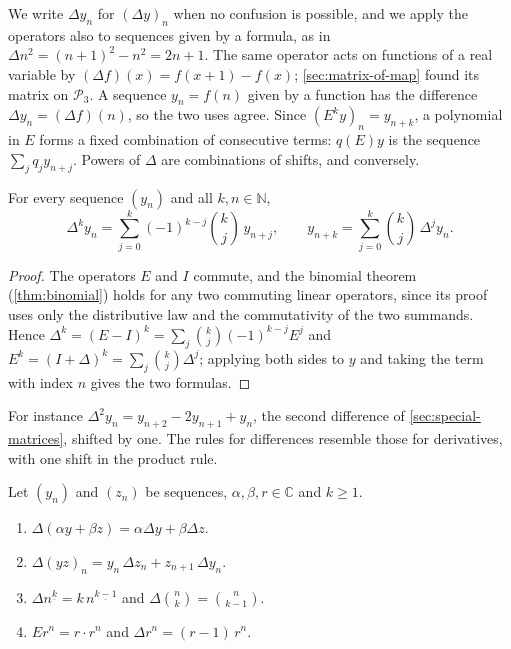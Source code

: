 We write $\Delta y_n$ for $(\Delta y)_n$ when no confusion is possible, and we apply the operators also to sequences given by a formula, as in $\Delta n^2=(n+1)^2-n^2=2n+1$. The same operator acts on functions of a real variable by $(\Delta f)(x)=f(x+1)-f(x)$; \cref{sec:matrix-of-map} found its matrix on $\mathcal P_3$. A sequence $y_n=f(n)$ given by a function has the difference $\Delta y_n=(\Delta f)(n)$, so the two uses agree. Since $(E^ky)_n=y_{n+k}$, a polynomial in $E$ forms a fixed combination of consecutive terms: $q(E)y$ is the sequence $\sum_jq_jy_{n+j}$. Powers of $\Delta$ are combinations of shifts, and conversely.

\begin{proposition}
\label{prop:difference-powers}
For every sequence $(y_n)$ and all $k,n\in\mathbb N$,
\[
\Delta^ky_n=\sum_{j=0}^k(-1)^{k-j}\binom kj\,y_{n+j},\qquad y_{n+k}=\sum_{j=0}^k\binom kj\,\Delta^jy_n .
\]
\end{proposition}

\begin{proof}
The operators $E$ and $I$ commute, and the binomial theorem (\cref{thm:binomial}) holds for any two commuting linear operators, since its proof uses only the distributive law and the commutativity of the two summands. Hence $\Delta^k=(E-I)^k=\sum_j\binom kj(-1)^{k-j}E^j$ and $E^k=(I+\Delta)^k=\sum_j\binom kj\Delta^j$; applying both sides to $y$ and taking the term with index $n$ gives the two formulas.
\end{proof}

For instance $\Delta^2y_n=y_{n+2}-2y_{n+1}+y_n$, the second difference of \cref{sec:special-matrices}, shifted by one. The rules for differences resemble those for derivatives, with one shift in the product rule.

\begin{proposition}
\label{prop:difference-rules}
Let $(y_n)$ and $(z_n)$ be sequences, $\alpha,\beta,r\in\mathbb C$ and $k\ge1$.
\begin{enumerate}
\item $\Delta(\alpha y+\beta z)=\alpha\Delta y+\beta\Delta z$.
\item $\Delta(yz)_n=y_n\,\Delta z_n+z_{n+1}\,\Delta y_n$.
\item $\Delta n^{\underline k}=k\,n^{\underline{k-1}}$ and $\Delta\binom nk=\binom n{k-1}$.
\item $Er^n=r\cdot r^n$ and $\Delta r^n=(r-1)\,r^n$.
\end{enumerate}
\end{proposition}

